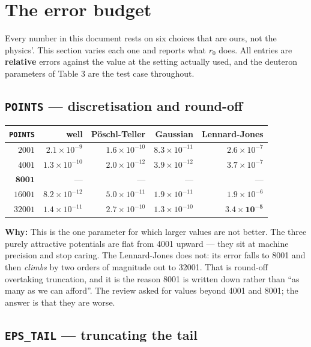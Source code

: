 \documentclass[11pt,a4paper]{article}
\newcommand{\why}[1]{\medskip\noindent\textbf{Why:} #1\medskip}
\begin{document}
\section{The error budget}
\label{sec:budget}

Every number in this document rests on six choices that are ours, not the
physics'. This section varies each one and reports what $r_0$ does. All entries
are \textbf{relative} errors against the value at the setting actually used, and
the deuteron parameters of Table 3 are the test case throughout.

\subsection*{\texttt{POINTS} --- discretisation and round-off}

\begin{center}\small
\begin{tabular}{rrrrr}
\toprule
\texttt{POINTS} & well & Pöschl-Teller & Gaussian & Lennard-Jones \\
\midrule
$2001$ & $2.1\times10^{-9}$ & $1.6\times10^{-10}$ & $8.3\times10^{-11}$ & $2.6\times10^{-7}$ \\
$4001$ & $1.3\times10^{-10}$ & $2.0\times10^{-12}$ & $3.9\times10^{-12}$ & $3.7\times10^{-7}$ \\
$\mathbf{8001}$ & --- & --- & --- & --- \\
$16001$ & $8.2\times10^{-12}$ & $5.0\times10^{-11}$ & $1.9\times10^{-11}$ & $1.9\times10^{-6}$ \\
$32001$ & $1.4\times10^{-11}$ & $2.7\times10^{-10}$ & $1.3\times10^{-10}$ & $\mathbf{3.4\times10^{-5}}$ \\
\bottomrule
\end{tabular}
\end{center}

\why{This is the one parameter for which larger values are not better.
The three purely attractive potentials are flat from 4001 upward --- they sit at
machine precision and stop caring. The Lennard-Jones does not: its error falls
to 8001 and then \emph{climbs} by two orders of magnitude out to 32001. That is
round-off overtaking truncation, and it is the reason 8001 is written down
rather than ``as many as we can afford''. The review asked for values beyond
4001 and 8001; the answer is that they are worse.}

\subsection*{\texttt{EPS\_TAIL} --- truncating the tail}
\end{document}

